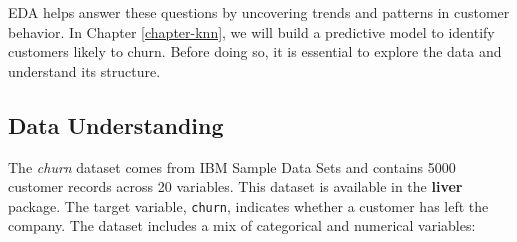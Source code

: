 \documentclass[
]{book}
\newcommand{\passthrough}[1]{#1}
\theoremstyle{definition}
\theoremstyle{definition}
\theoremstyle{definition}
\theoremstyle{definition}
\theoremstyle{remark}
\begin{document}
EDA helps answer these questions by uncovering trends and patterns in customer behavior. In Chapter \ref{chapter-knn}, we will build a predictive model to identify customers likely to churn. Before doing so, it is essential to explore the data and understand its structure.

\subsection*{Data Understanding}\label{data-understanding}

The \emph{churn} dataset comes from IBM Sample Data Sets and contains 5000 customer records across 20 variables. This dataset is available in the \textbf{liver} package. The target variable, \passthrough{\lstinline!churn!}, indicates whether a customer has left the company. The dataset includes a mix of categorical and numerical variables:
\end{document}
